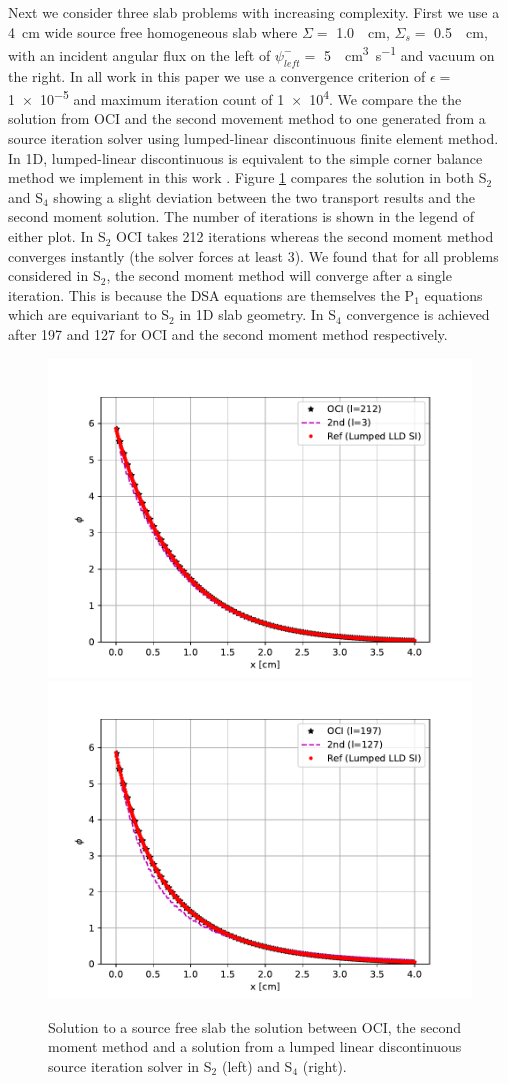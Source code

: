 Next we consider three slab problems with increasing complexity.
First we use a \SI{4}{\centi\meter} wide source free homogeneous slab where $\Sigma=$ \SI{1.0}{\per\centi\meter}, $\Sigma_s=$ \SI{0.5}{\per\centi\meter}, with an incident angular flux on the left of $\psi_{left}^-=$ \SI{5}{\per\centi\meter\cubed\per\s} and vacuum on the right.
In all work in this paper we use a convergence criterion of $\epsilon = $ \num{1e-5} and maximum iteration count of \num{1e4}.
We compare the the solution from OCI and the second movement method to one generated from a source iteration solver using lumped-linear discontinuous finite element method.
In 1D, lumped-linear discontinuous is equivalent to the simple corner balance method we implement in this work \cite{adams_subcell_1997}.
Figure \ref{fig:regression_slab} compares the solution in both S$_2$ and S$_4$ showing a slight deviation between the two transport results and the second moment solution.
The number of iterations is shown in the legend of either plot.
In S$_2$ OCI takes 212 iterations whereas the second moment method converges instantly (the solver forces at least 3).
We found that for all problems considered in S$_2$, the second moment method will converge after a single iteration.
This is because the DSA equations are themselves the P$_1$ equations which are equivariant to S$_2$ in 1D slab geometry.
In S$_4$ convergence is achieved after \num{197} and \num{127} for OCI and the second moment method respectively.

\begin{figure}
    \centering
    \includegraphics[width=.49\linewidth]{figures/smm_paper/regression_slabs2.pdf}
    \includegraphics[width=.49\linewidth]{figures/smm_paper/regression_slabs4.pdf}
    \caption{Solution to a source free slab the solution between OCI, the second moment method and a solution from a lumped linear discontinuous source iteration solver in S$_2$ (left) and S$_4$ (right).}
    \label{fig:regression_slab}
\end{figure}
 
